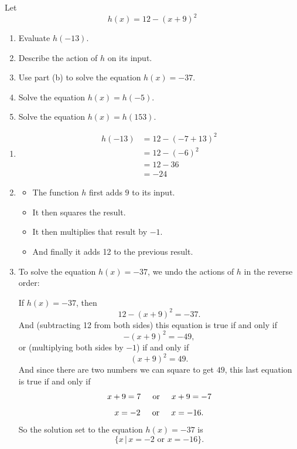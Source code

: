 \documentclass{ximera}
\begin{document}
\begin{question} \label{Q9emfe}
Let 
\[
    h(x) =12 -  (x+9)^2
\]

\begin{enumerate}
\item Evaluate $h(-13)$.

\item Describe the action of $h$ on its input.

\item Use part (b) to solve the equation $h(x) = -37$.

\item Solve the equation $h(x) = h(-5)$.

\item Solve the equation $h(x) = h(153)$.
\end{enumerate}

\begin{explanation}
\begin{enumerate}
\item
\begin{align*}
 h(-13) &= 12 - (-7+13)^2 \\
         &= 12 - (-6)^2 \\ 
         &= 12 - 36  \\
         &= -24
\end{align*}

\item \begin{itemize}
\item The function $h$ first adds $9$ to its input. 
\item It then squares the result.
\item It then multiplies that result by $-1$.
\item And finally it adds 12 to the previous result. 
\end{itemize}

\item To solve the equation $h(x) = -37$, we undo the actions of $h$ in the reverse order:

If $h(x) = -37$, then
\[
      12 -  (x+9)^2 = -37 .
\] 
And (subtracting 12 from both sides) this equation is true if and only if
\[
      - (x+9)^2 = -49,
\]
or (multiplying both sides by $-1$) if and only if
\[
 (x+9)^2 = 49.
\]
And since there are two numbers we can square to get $49$, this last equation is true if and only if
\[
  x+ 9 = 7 \hskip 0.2 in \text{or} \hskip 0.2 in  x+9 = -7
\]
\[
   x = -2  \hskip 0.2 in \text{or} \hskip 0.2 in  x = -16 .
\]
So the solution set to the equation $h(x)=-37$ is
\[
    \{x \, | \, x=-2 \text{ or } x=-16   \}.
\]



\end{enumerate}
\end{explanation}
\end{question}
\end{document}
